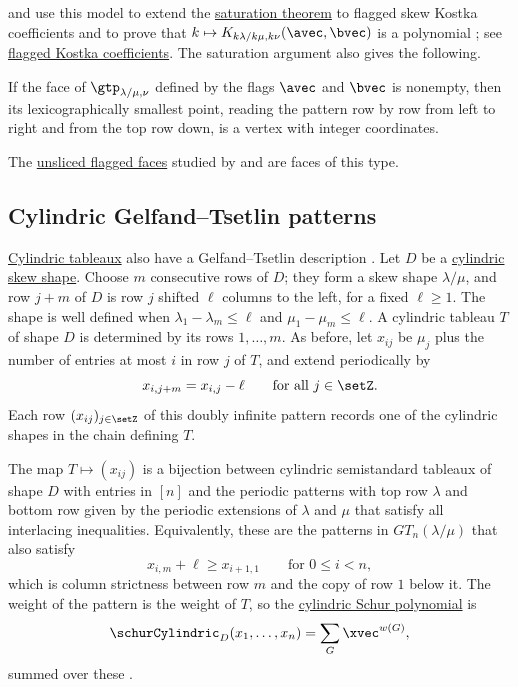  and  use this model to
extend the \hyperref[gtKostkaSaturation]{saturation theorem} to flagged skew
Kostka coefficients and to prove that $k \mapsto K_{k\lambda/k\mu,k\nu}(\avec,\bvec)$
is a polynomial \cite[Thm.~28 and Cor.~36]{AlexanderssonOguz2023x}; see
\hyperref[flaggedSchurKostka]{flagged Kostka coefficients}.  The saturation
argument also gives the following.

\begin{theorem}
\label{flaggedGTLexMinVertex}
If the face of $\gtp_{\lambda/\mu,\nu}$ defined by the flags $\avec$ and
$\bvec$ is nonempty, then its lexicographically smallest point, reading the
pattern row by row from left to right and from the top row down, is a vertex
with integer coordinates.
\end{theorem}

The \hyperref[gtEhrhart]{unsliced flagged faces} studied by  and  are faces of this type.


\subsection[cylindricGTPatterns]{Cylindric Gelfand--Tsetlin patterns}

\hyperref[cylindricSemistandardTableau]{Cylindric tableaux} also have a
Gelfand--Tsetlin description \cite[Sec.~6.1]{AlexanderssonOguz2023x}.
Let $D$ be a \hyperref[cylindricSkewShape]{cylindric skew shape}.  Choose
$m$ consecutive rows of $D$; they form a skew shape $\lambda/\mu$, and row
$j+m$ of $D$ is row $j$ shifted $\ell$ columns to the left, for a fixed
$\ell \geq 1$.  The shape is well defined when
$\lambda_1-\lambda_m \leq \ell$ and $\mu_1-\mu_m \leq \ell$.
A cylindric tableau $T$ of shape $D$ is determined by its rows $1,\dotsc,m$.
As before, let $x_{ij}$ be $\mu_j$ plus the number of entries at most $i$ in
row $j$ of $T$, and extend periodically by
\[
x_{i,j+m} = x_{i,j} - \ell \qquad \text{for all } j \in \setZ.
\]
Each row $(x_{ij})_{j\in\setZ}$ of this doubly infinite pattern records one of
the cylindric shapes in the chain defining $T$.

\begin{proposition}
\label{cylindricGTBijection}
The map $T\mapsto (x_{ij})$ is a bijection between cylindric semistandard
tableaux of shape $D$ with entries in $[n]$ and the periodic patterns with top
row $\lambda$ and bottom row given by the periodic extensions of $\lambda$ and $\mu$ that
satisfy all interlacing inequalities.
Equivalently, these are the patterns in $GT_n(\lambda/\mu)$ that also satisfy
\[
x_{i,m}+\ell \geq x_{i+1,1} \qquad \text{for } 0 \leq i \lt n,
\]
which is column strictness between row $m$ and the copy of row $1$ below it.
The weight of the pattern is the weight of $T$, so the
\hyperref[cylindricSchurFunction]{cylindric Schur polynomial} is
\[
\schurCylindric_D(x_1,\dotsc,x_n) = \sum_G \xvec^{w(G)},
\]
summed over these \label{cylindricGTPattern}.
\end{proposition}

